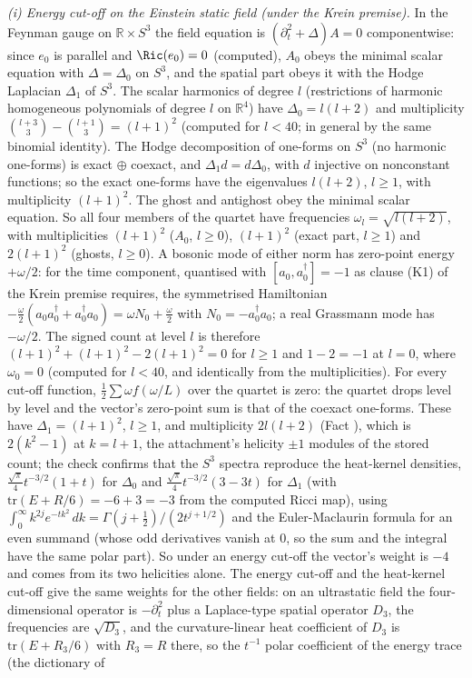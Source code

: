 \emph{(i) Energy cut-off on the Einstein static field (under the Krein premise).} In the Feynman gauge on $\mathbb{R}\times S^{3}$ the field equation is $(\partial_{t}^{2} + \Delta)A = 0$ componentwise: since $e_{0}$ is parallel and $\Ric(e_{0}) = 0$ (computed), $A_{0}$ obeys the minimal scalar equation with $\Delta = \Delta_{0}$ on $S^{3}$, and the spatial part obeys it with the Hodge Laplacian $\Delta_{1}$ of $S^{3}$. The scalar harmonics of degree $l$ (restrictions of harmonic homogeneous polynomials of degree $l$ on $\mathbb{R}^{4}$) have $\Delta_{0} = l(l+2)$ and multiplicity $\binom{l+3}{3} - \binom{l+1}{3} = (l+1)^{2}$ (computed for $l < 40$; in general by the same binomial identity). The Hodge decomposition of one-forms on $S^{3}$ (no harmonic one-forms) is exact $\oplus$ coexact, and $\Delta_{1}d = d\Delta_{0}$, with $d$ injective on nonconstant functions; so the exact one-forms have the eigenvalues $l(l+2)$, $l \ge 1$, with multiplicity $(l+1)^{2}$. The ghost and antighost obey the minimal scalar equation. So all four members of the quartet have frequencies $\omega_{l} = \sqrt{l(l+2)}$, with multiplicities $(l+1)^{2}$ ($A_{0}$, $l \ge 0$), $(l+1)^{2}$ (exact part, $l \ge 1$) and $2(l+1)^{2}$ (ghosts, $l \ge 0$). A bosonic mode of either norm has zero-point energy $+\omega/2$: for the time component, quantised with $[a_{0}, a_{0}^{\dagger}] = -1$ as clause (K1) of the Krein premise requires, the symmetrised Hamiltonian $-\tfrac{\omega}{2}(a_{0}a_{0}^{\dagger} + a_{0}^{\dagger}a_{0}) = \omega N_{0} + \tfrac{\omega}{2}$ with $N_{0} = -a_{0}^{\dagger}a_{0}$; a real Grassmann mode has $-\omega/2$. The signed count at level $l$ is therefore $(l+1)^{2} + (l+1)^{2} - 2(l+1)^{2} = 0$ for $l \ge 1$ and $1 - 2 = -1$ at $l = 0$, where $\omega_{0} = 0$ (computed for $l < 40$, and identically from the multiplicities). For every cut-off function, $\tfrac12\sum\omega f(\omega/L)$ over the quartet is zero: the quartet drops level by level and the vector's zero-point sum is that of the coexact one-forms. These have $\Delta_{1} = (l+1)^{2}$, $l \ge 1$, and multiplicity $2l(l+2)$ (Fact ), which is $2(k^{2} - 1)$ at $k = l + 1$, the attachment's helicity $\pm 1$ modules of the stored count; the check confirms that the $S^{3}$ spectra reproduce the heat-kernel densities, $\tfrac{\sqrt{\pi}}{4}t^{-3/2}(1 + t)$ for $\Delta_{0}$ and $\tfrac{\sqrt{\pi}}{4}t^{-3/2}(3 - 3t)$ for $\Delta_{1}$ (with $\mathrm{tr}(E + R/6) = -6 + 3 = -3$ from the computed Ricci map), using $\int_{0}^{\infty}k^{2j}e^{-tk^{2}}\,dk = \Gamma(j + \tfrac12)/(2t^{j + 1/2})$ and the Euler-Maclaurin formula for an even summand (whose odd derivatives vanish at $0$, so the sum and the integral have the same polar part). So under an energy cut-off the vector's weight is $-4$ and comes from its two helicities alone. The energy cut-off and the heat-kernel cut-off give the same weights for the other fields: on an ultrastatic field the four-dimensional operator is $-\partial_{t}^{2}$ plus a Laplace-type spatial operator $D_{3}$, the frequencies are $\sqrt{D_{3}}$, and the curvature-linear heat coefficient of $D_{3}$ is $\mathrm{tr}(E + R_{3}/6)$ with $R_{3} = R$ there, so the $t^{-1}$ polar coefficient of the energy trace (the dictionary of 